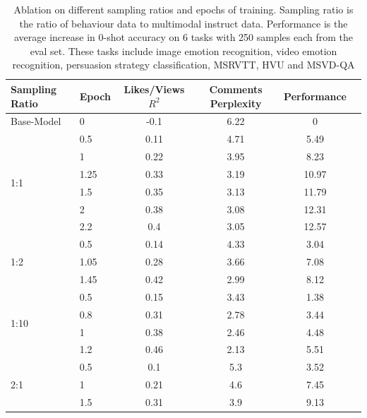 \begin{table}[]
\centering
\begin{adjustbox}{width=\textwidth}
\begin{tabular}{ll|cccc}
\toprule[1.2pt]
\textbf{Sampling Ratio}  & \textbf{Epoch} & \textbf{Likes/Views $R^2$} & \textbf{Comments Perplexity} & \textbf{Performance}\\ \midrule[1.2pt]
Base-Model & 0 & -0.1 & 6.22 & 0\\
\midrule
\multirow{6}{*}{1:1} & 0.5 & 0.11 & 4.71 & 5.49\\
& 1 & 0.22 & 3.95 & 8.23\\
& 1.25 & 0.33 & 3.19 & 10.97\\
& 1.5 & 0.35 & 3.13 & 11.79\\
& 2 & 0.38 & 3.08 & 12.31\\
& 2.2 & 0.4 & 3.05 & 12.57\\
\midrule
\multirow{3}{*}{1:2} & 0.5 & 0.14 & 4.33 & 3.04\\
& 1.05 & 0.28 & 3.66 & 7.08\\
& 1.45 & 0.42 & 2.99 & 8.12\\
\midrule
\multirow{4}{*}{1:10} & 0.5 & 0.15 & 3.43 & 1.38\\
& 0.8 & 0.31 & 2.78 & 3.44\\
& 1 & 0.38 & 2.46 & 4.48\\
& 1.2 & 0.46 & 2.13 & 5.51\\
\midrule
\multirow{3}{*}{2:1} & 0.5 & 0.1 & 5.3 & 3.52\\
& 1 & 0.21 & 4.6 & 7.45\\
& 1.5 & 0.31 & 3.9 & 9.13\\
\bottomrule[1.2pt]
\end{tabular}
\end{adjustbox}
\caption{Ablation on different sampling ratios and epochs of training. Sampling ratio is the ratio of behaviour data to multimodal instruct data. Performance is the average increase in 0-shot accuracy on 6 tasks with 250 samples each from the eval set. These tasks include image emotion recognition, video emotion recognition, persuasion strategy classification, MSRVTT, HVU and MSVD-QA \label{tab:eval-ablation}}
\end{table}









